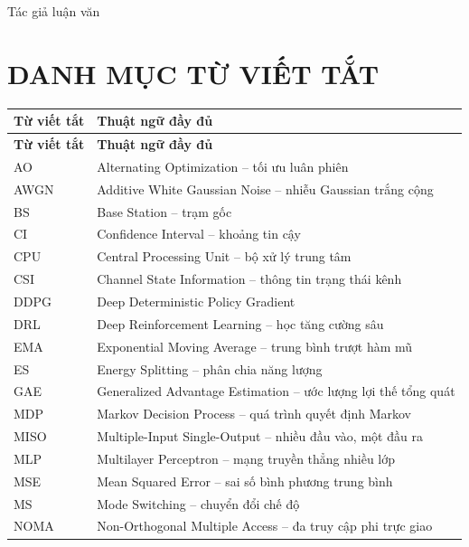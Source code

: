 \vspace{1.2cm}
\begin{flushright}
Tác giả luận văn\\[2.2cm]
\AuthorName
\end{flushright}

\clearpage
\tableofcontents
\clearpage
\listoftables
\clearpage
\listoffigures
\clearpage

\chapter*{DANH MỤC TỪ VIẾT TẮT}
\begin{longtable}{p{2.4cm}p{11.7cm}}
\toprule
\textbf{Từ viết tắt} & \textbf{Thuật ngữ đầy đủ}\tabularnewline
\midrule
\endfirsthead
\toprule
\textbf{Từ viết tắt} & \textbf{Thuật ngữ đầy đủ}\tabularnewline
\midrule
\endhead
AO & Alternating Optimization -- tối ưu luân phiên\\
AWGN & Additive White Gaussian Noise -- nhiễu Gaussian trắng cộng\\
BS & Base Station -- trạm gốc\\
CI & Confidence Interval -- khoảng tin cậy\\
CPU & Central Processing Unit -- bộ xử lý trung tâm\\
CSI & Channel State Information -- thông tin trạng thái kênh\\
DDPG & Deep Deterministic Policy Gradient\\
DRL & Deep Reinforcement Learning -- học tăng cường sâu\\
EMA & Exponential Moving Average -- trung bình trượt hàm mũ\\
ES & Energy Splitting -- phân chia năng lượng\\
GAE & Generalized Advantage Estimation -- ước lượng lợi thế tổng quát\\
MDP & Markov Decision Process -- quá trình quyết định Markov\\
MISO & Multiple-Input Single-Output -- nhiều đầu vào, một đầu ra\\
MLP & Multilayer Perceptron -- mạng truyền thẳng nhiều lớp\\
MSE & Mean Squared Error -- sai số bình phương trung bình\\
MS & Mode Switching -- chuyển đổi chế độ\\
NOMA & Non-Orthogonal Multiple Access -- đa truy cập phi trực giao\\

\end{longtable}

